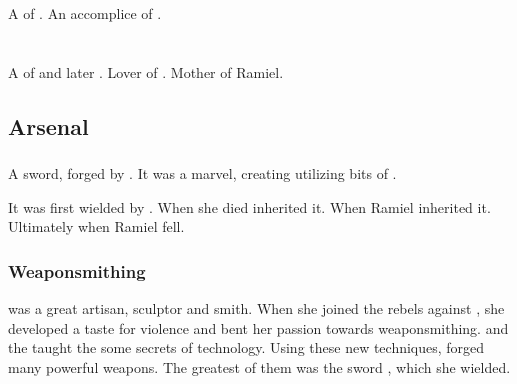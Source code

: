 \section{\Gilchad}
\index{\Gilchad}
A \thelyad{} \resphan{} of \Mystraacht. 
An accomplice of \Cishiel. 

















\section{\Lyorith}
\index{\Lyorith}
A \resvil{} of \Merkyrah{} and later \Mystraacht. 
Lover of \Nathrach. 
Mother of Ramiel. 









\subsection{Arsenal}
\subsubsection{\Ascaril}
\index{\Ascaril}
A  sword, forged by \Lyorith. 
It was a marvel, creating utilizing bits of . 

It was first wielded by \Lyorith. 
When she died \Nathrach{} inherited it. 
When  Ramiel inherited it. 
Ultimately  when Ramiel fell. 





\subsubsection{Weaponsmithing}
\Lyorith{} was a great artisan, sculptor and smith. 
When she joined the rebels against \Merkyrah, she developed a taste for violence and bent her passion towards weaponsmithing. 
\Semiza{} and the \banelords{} taught the \resphain{} some secrets of technology. 
Using these new techniques, \Lyorith{} forged many powerful weapons. 
The greatest of them was the sword , which she wielded. 

